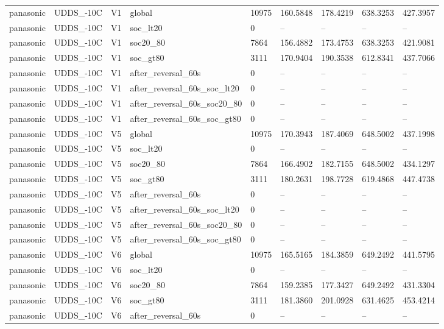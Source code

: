\begin{tabular}{lllllllll}
panasonic & UDDS\_-10C & V1 & global & 10975 & 160.5848 & 178.4219 & 638.3253 & 427.3957 \\
panasonic & UDDS\_-10C & V1 & soc\_lt20 & 0 & -- & -- & -- & -- \\
panasonic & UDDS\_-10C & V1 & soc20\_80 & 7864 & 156.4882 & 173.4753 & 638.3253 & 421.9081 \\
panasonic & UDDS\_-10C & V1 & soc\_gt80 & 3111 & 170.9404 & 190.3538 & 612.8341 & 437.7066 \\
panasonic & UDDS\_-10C & V1 & after\_reversal\_60s & 0 & -- & -- & -- & -- \\
panasonic & UDDS\_-10C & V1 & after\_reversal\_60s\_soc\_lt20 & 0 & -- & -- & -- & -- \\
panasonic & UDDS\_-10C & V1 & after\_reversal\_60s\_soc20\_80 & 0 & -- & -- & -- & -- \\
panasonic & UDDS\_-10C & V1 & after\_reversal\_60s\_soc\_gt80 & 0 & -- & -- & -- & -- \\
panasonic & UDDS\_-10C & V5 & global & 10975 & 170.3943 & 187.4069 & 648.5002 & 437.1998 \\
panasonic & UDDS\_-10C & V5 & soc\_lt20 & 0 & -- & -- & -- & -- \\
panasonic & UDDS\_-10C & V5 & soc20\_80 & 7864 & 166.4902 & 182.7155 & 648.5002 & 434.1297 \\
panasonic & UDDS\_-10C & V5 & soc\_gt80 & 3111 & 180.2631 & 198.7728 & 619.4868 & 447.4738 \\
panasonic & UDDS\_-10C & V5 & after\_reversal\_60s & 0 & -- & -- & -- & -- \\
panasonic & UDDS\_-10C & V5 & after\_reversal\_60s\_soc\_lt20 & 0 & -- & -- & -- & -- \\
panasonic & UDDS\_-10C & V5 & after\_reversal\_60s\_soc20\_80 & 0 & -- & -- & -- & -- \\
panasonic & UDDS\_-10C & V5 & after\_reversal\_60s\_soc\_gt80 & 0 & -- & -- & -- & -- \\
panasonic & UDDS\_-10C & V6 & global & 10975 & 165.5165 & 184.3859 & 649.2492 & 441.5795 \\
panasonic & UDDS\_-10C & V6 & soc\_lt20 & 0 & -- & -- & -- & -- \\
panasonic & UDDS\_-10C & V6 & soc20\_80 & 7864 & 159.2385 & 177.3427 & 649.2492 & 431.3304 \\
panasonic & UDDS\_-10C & V6 & soc\_gt80 & 3111 & 181.3860 & 201.0928 & 631.4625 & 453.4214 \\
panasonic & UDDS\_-10C & V6 & after\_reversal\_60s & 0 & -- & -- & -- & -- \\

\end{tabular}
